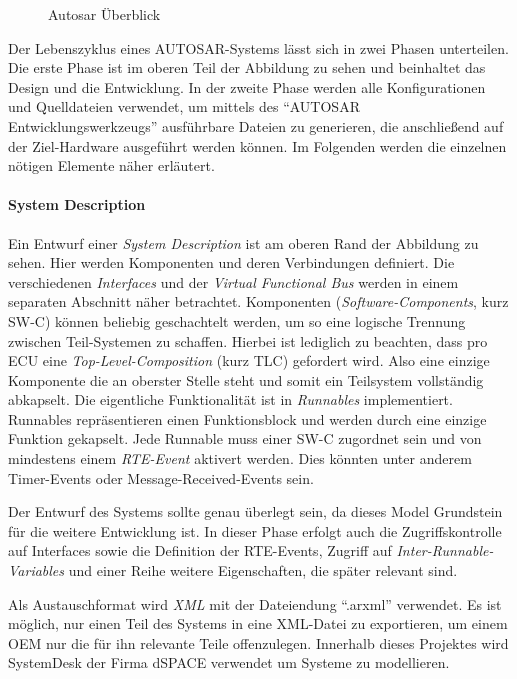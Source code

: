 \documentclass[
  a4paper,					    %
  twoside,
  DIV=calc,     				%
  bibliography=totoc,
  cleardoublepage=empty,
  ngerman,     					%
  final       					%
]{scrbook}
\begin{document}
\begin{figure}[p]
    \centering
    \resizebox{\linewidth}{!}{}
    \caption{Autosar Überblick}
    \label{fig:autosar_overview}
\end{figure}

Der Lebenszyklus eines AUTOSAR-Systems lässt sich in zwei Phasen unterteilen. Die erste Phase ist im oberen Teil der Abbildung zu sehen und beinhaltet das Design und die Entwicklung. In der zweite Phase werden alle Konfigurationen und Quelldateien verwendet, um mittels des "`AUTOSAR Entwicklungswerkzeugs"'  ausführbare Dateien zu generieren, die anschließend auf der Ziel-Hardware ausgeführt werden können. Im Folgenden werden die einzelnen nötigen Elemente näher erläutert.


\paragraph{System Description} Ein Entwurf einer \emph{System Description} ist am oberen Rand der Abbildung zu sehen. Hier werden Komponenten und deren Verbindungen definiert. Die verschiedenen \emph{Interfaces} und der \emph{Virtual Functional Bus} werden in einem separaten Abschnitt näher betrachtet. Komponenten (\emph{Software-Components}, kurz SW-C) können beliebig geschachtelt werden, um so eine logische Trennung zwischen Teil-Systemen zu schaffen. Hierbei ist lediglich zu beachten, dass pro ECU eine \emph{Top-Level-Composition} (kurz TLC) gefordert wird. Also eine einzige Komponente die an oberster Stelle steht und somit ein Teilsystem vollständig abkapselt. Die eigentliche Funktionalität ist in \emph{Runnables} implementiert. Runnables repräsentieren einen Funktionsblock und werden durch eine einzige Funktion gekapselt. Jede Runnable muss einer SW-C zugordnet sein und von mindestens einem \emph{RTE-Event} aktivert werden. Dies könnten unter anderem Timer-Events oder Message-Received-Events sein.

Der Entwurf des Systems sollte genau überlegt sein, da dieses Model Grundstein für die weitere Entwicklung ist. In dieser Phase erfolgt auch die Zugriffskontrolle auf Interfaces sowie die Definition der RTE-Events, Zugriff auf \emph{Inter-Runnable-Variables} und einer Reihe weitere Eigenschaften, die später relevant sind.

Als Austauschformat wird \emph{XML} mit der Dateiendung "`.arxml"' verwendet. Es ist möglich, nur einen Teil des Systems in eine XML-Datei zu exportieren, um einem OEM nur die für ihn relevante Teile offenzulegen. Innerhalb dieses Projektes wird SystemDesk der Firma dSPACE verwendet um Systeme zu modellieren.
\end{document}
